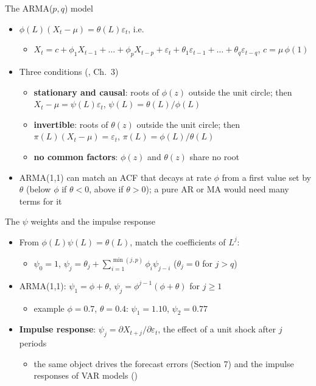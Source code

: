 \begin{frame}{The ARMA($p,q$) model}
\itemsize{\small}
\begin{itemize}
    \item $\phi(L)(X_t - \mu) = \theta(L)\varepsilon_t$, i.e.
    \begin{itemize}
        \item $X_t = c + \phi_1X_{t-1} + \dots + \phi_pX_{t-p} + \varepsilon_t + \theta_1\varepsilon_{t-1} + \dots + \theta_q\varepsilon_{t-q}$, $c = \mu\,\phi(1)$
    \end{itemize}
    \item Three conditions (, Ch.~3)
    \begin{itemize}
        \item \textbf{stationary and causal}: roots of $\phi(z)$ outside the unit circle; then $X_t - \mu = \psi(L)\varepsilon_t$, $\psi(L) = \theta(L)/\phi(L)$
        \item \textbf{invertible}: roots of $\theta(z)$ outside the unit circle; then $\pi(L)(X_t - \mu) = \varepsilon_t$, $\pi(L) = \phi(L)/\theta(L)$
        \item \textbf{no common factors}: $\phi(z)$ and $\theta(z)$ share no root
    \end{itemize}
    \item ARMA(1,1) can match an ACF that decays at rate $\phi$ from a first value set by $\theta$ (below $\phi$ if $\theta < 0$, above if $\theta > 0$); a pure AR or MA would need many terms for it
\end{itemize}
\end{frame}

\begin{frame}{The $\psi$ weights and the impulse response}
\itemsize{\small}
\begin{itemize}
    \item From $\phi(L)\psi(L) = \theta(L)$, match the coefficients of $L^j$:
    \begin{itemize}
        \item $\psi_0 = 1$, \quad $\psi_j = \theta_j + \sum_{i=1}^{\min(j,p)}\phi_i\psi_{j-i}$ \quad ($\theta_j = 0$ for $j > q$)
    \end{itemize}
    \item ARMA(1,1): $\psi_1 = \phi + \theta$, $\psi_j = \phi^{j-1}(\phi + \theta)$ for $j \ge 1$
    \begin{itemize}
        \item example $\phi = 0.7$, $\theta = 0.4$: $\psi_1 = 1.10$, $\psi_2 = 0.77$
    \end{itemize}
    \item \textbf{Impulse response}: $\psi_j = \partial X_{t+j}/\partial\varepsilon_t$, the effect of a unit shock after $j$ periods
    \begin{itemize}
        \item the same object drives the forecast errors (Section 7) and the impulse responses of VAR models ()
    \end{itemize}
\end{itemize}
\end{frame}


